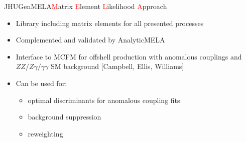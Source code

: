 \documentclass[usenames,dvipsnames,svgnames,table]{beamer}
\begin{document}
\begin{frame}{JHUGenMELA}{\textcolor{red}{M}atrix \textcolor{red}{E}lement \textcolor{red}{L}ikelihood \textcolor{red}{A}pproach}
\begin{itemize}
\item Library including matrix elements for all presented processes
\begin{multicols}{3}
\end{multicols}
\item Complemented and validated by AnalyticMELA
\item Interface to MCFM for offshell production with anomalous couplings and $ZZ/Z\gamma/\gamma\gamma$ SM background \tiny [Campbell, Ellis, Williams] \normalsize
\item Can be used for:
\begin{itemize}[label=-]
\item optimal discriminants for anomalous coupling fits
\item background suppression
\item reweighting
\end{itemize}
\end{itemize}
\end{frame}
\end{document}
